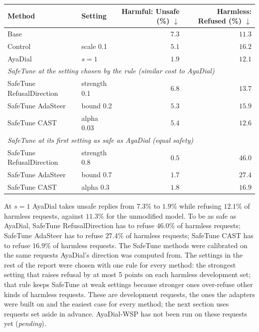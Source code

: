 \documentclass[10pt,a4paper]{article}
\renewcommand{\arraystretch}{1.12}
\begin{document}
\begin{table}[H]\centering\small\renewcommand{\arraystretch}{1.3}\begin{tabular}{|l|l|r|r|}\hline
Method & Setting & \makecell[r]{Harmful:\\Unsafe (\%) $\downarrow$} & \makecell[r]{Harmless:\\Refused (\%) $\downarrow$}\\\hline
Base &  & $7.3$ & $11.3$\\\hline
Control & scale 0.1 & $5.1$ & $16.2$\\\hline
AyaDial & $s = 1$ & \cellcolor{win}$\mathbf{1.9}$ & \cellcolor{win}$\mathbf{12.1}$\\\hline
\multicolumn{4}{|l|}{\cellcolor{black!6}\textit{SafeTune at the setting chosen by the rule (similar cost to AyaDial)}}\\\hline
SafeTune RefusalDirection & strength 0.1 & $6.8$ & $13.7$\\\hline
SafeTune AdaSteer & bound 0.2 & $5.3$ & $15.9$\\\hline
SafeTune CAST & alpha 0.03 & $5.4$ & $12.6$\\\hline
\multicolumn{4}{|l|}{\cellcolor{black!6}\textit{SafeTune at its first setting as safe as AyaDial (equal safety)}}\\\hline
SafeTune RefusalDirection & strength 0.8 & $0.5$ & $46.0$\\\hline
SafeTune AdaSteer & bound 0.7 & $1.7$ & $27.4$\\\hline
SafeTune CAST & alpha 0.3 & $1.8$ & $16.9$\\\hline
\end{tabular}\end{table}
At $s = 1$ AyaDial takes unsafe replies from $7.3$\% to $1.9$\% while refusing $12.1$\% of harmless requests, against $11.3$\% for the unmodified model. To be as safe as AyaDial, SafeTune RefusalDirection has to refuse $46.0$\% of harmless requests; SafeTune AdaSteer has to refuse $27.4$\% of harmless requests; SafeTune CAST has to refuse $16.9$\% of harmless requests. The SafeTune methods were calibrated on the same requests AyaDial's direction was computed from. The settings in the rest of the report were chosen with one rule for every method: the strongest setting that raises refusal by at most 5 points on each harmless development set; that rule keeps SafeTune at weak settings because stronger ones over-refuse other kinds of harmless requests. These are development requests, the ones the adapters were built on and the easiest case for every method; the next section uses requests set aside in advance. AyaDial-WSP has not been run on these requests yet (\textit{pending}).
\end{document}
